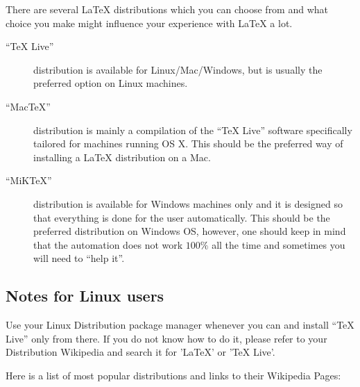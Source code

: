 \documentclass[
    draft
]{scrartcl}
\newcommand{\MiKTeX}{MiK\TeX}
\newcommand{\MacTeX}{Mac\TeX}
\begin{document}
%
There are several \LaTeX{} distributions which you can choose from and what
    choice you make might influence your experience with \LaTeX{} a lot.
%
\begin{description}
    \item[``\TeX{} Live''] distribution is available for Linux/Mac/Windows, but
            is usually the preferred option on Linux machines.
    \item[``\MacTeX''] distribution is mainly a compilation of the
            ``\TeX{} Live'' software specifically tailored for machines running
            OS X. 
        This should be the preferred way of installing a \LaTeX{} distribution
            on a Mac.
    \item[``\MiKTeX''] distribution is available for Windows machines only and
            it is designed so that everything is done for the user
            automatically. 
        This should be the preferred distribution on Windows OS, however, one
            should keep in mind that the automation does not work $100\%$ all
            the time and sometimes you will need to ``help it''.
\end{description}

\subsection{Notes for Linux users}

Use your Linux Distribution package manager whenever you can and install
``\TeX{} Live'' only from there. If you do not know how to do it, please refer to
your Distribution Wikipedia and search it for 'LaTeX' or 'TeX Live'.

Here is a list of most popular distributions and links to their Wikipedia Pages:
\end{document}
